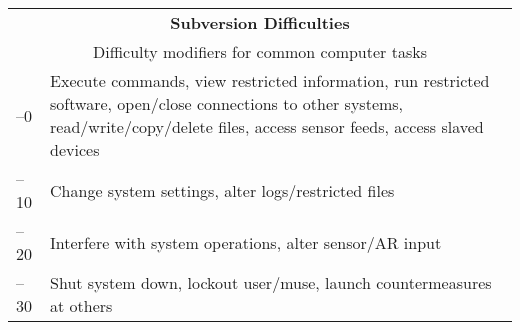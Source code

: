 \begin{table}
\begin{tabularx}{\textwidth}{|l|X|}
\hline
\multicolumn{2}{|c|}{\textbf{Subversion Difficulties}} \\
\multicolumn{2}{|c|}{Difficulty modifiers for common computer tasks} \\
\hline
\hline
–0 & Execute commands, view restricted information, run restricted software, open/close connections to other systems, read/write/copy/delete files, access sensor feeds, access slaved devices  \\
\hline
–10 & Change system settings, alter logs/restricted files  \\
\hline
–20 & Interfere with system operations, alter sensor/AR input  \\
\hline
–30 & Shut system down, lockout user/muse, launch countermeasures at others \\
\hline
\end{tabularx}
\label{tab:subversion-difficulties}
\end{table}


